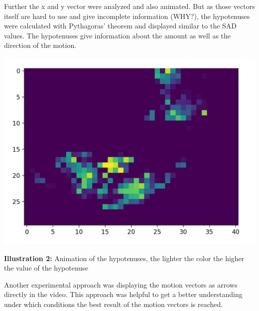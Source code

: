 \documentclass[12pt, a4paper]{report}
\begin{document}
\bigskip
 
Further the x and y vector were analyzed and also animated. But as those vectors itself are hard to use and give incomplete information (WHY?), the hypotenuses were calculated with Pythagoras' theorem and displayed similar to the SAD values. The hypotenuses give information about the amount as well as the direction of the motion.
 
 \bigskip

\noindent
\begin{center}
\includegraphics[scale=0.6]{Images/animation_hypotenuse.png}

{\bf Illustration 2:}  Animation of the hypotenuses, the lighter the color the higher the value of the hypotenuse
\end{center}

\bigskip

Another experimental approach was displaying the motion vectors as arrows directly in the video. This approach was helpful to get a better understanding under which conditions the best result of the motion vectors is reached.
\pagebreak
\end{document}
